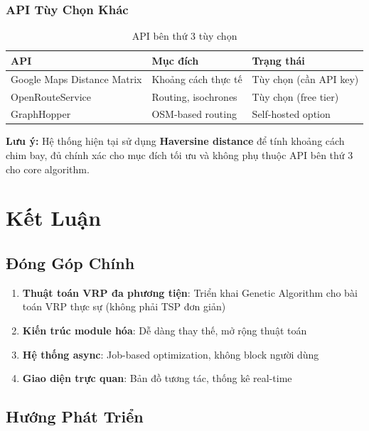 \documentclass[12pt,a4paper,openany,oneside]{report}
\begin{document}
\subsection{API Tùy Chọn Khác}

\begin{table}[h]
\centering
\caption{API bên thứ 3 tùy chọn}
\begin{tabular}{@{}lll@{}}
\toprule
\textbf{API} & \textbf{Mục đích} & \textbf{Trạng thái} \\
\midrule
Google Maps Distance Matrix & Khoảng cách thực tế & Tùy chọn (cần API key) \\
OpenRouteService & Routing, isochrones & Tùy chọn (free tier) \\
GraphHopper & OSM-based routing & Self-hosted option \\
\bottomrule
\end{tabular}
\end{table}

\textbf{Lưu ý:} Hệ thống hiện tại sử dụng \textbf{Haversine distance} để tính khoảng cách chim bay, đủ chính xác cho mục đích tối ưu và không phụ thuộc API bên thứ 3 cho core algorithm.

\chapter{Kết Luận}

\section{Đóng Góp Chính}

\begin{enumerate}
    \item \textbf{Thuật toán VRP đa phương tiện}: Triển khai Genetic Algorithm cho bài toán VRP thực sự (không phải TSP đơn giản)
    \item \textbf{Kiến trúc module hóa}: Dễ dàng thay thế, mở rộng thuật toán
    \item \textbf{Hệ thống async}: Job-based optimization, không block người dùng
    \item \textbf{Giao diện trực quan}: Bản đồ tương tác, thống kê real-time
\end{enumerate}

\section{Hướng Phát Triển}
\end{document}
